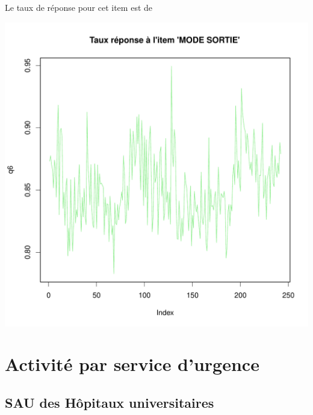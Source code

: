 \documentclass[12pt,english,french,twoside]{report}\usepackage[]{graphicx}\usepackage[]{color}
\makeatletter
\def\maxwidth{ %
  \ifdim\Gin@nat@width>\linewidth
    \linewidth
  \else
    \Gin@nat@width
  \fi
}
\makeatother
\begin{document}
Le taux de réponse pour cet item est de

\includegraphics[width=\maxwidth]{figure/retour_dom3} 




\part{Activité par service d'urgence}

\chapter{SAU des Hôpitaux universitaires}
\end{document}
